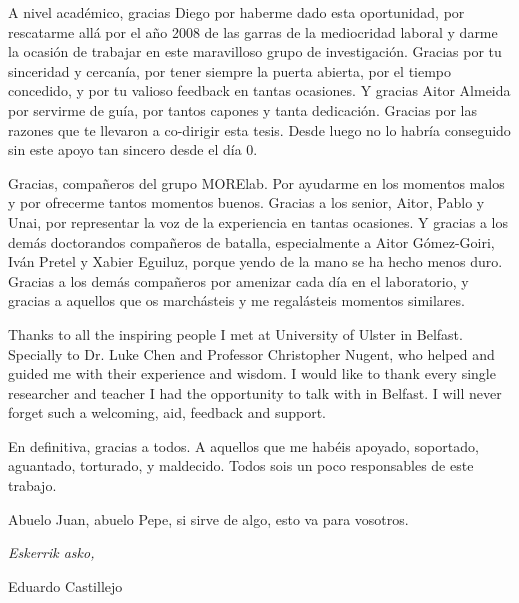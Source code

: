 \begin{acknowledgementslong}
A nivel académico, gracias Diego por haberme dado esta oportunidad, por rescatarme
allá por el año 2008 de las garras de la mediocridad laboral y darme la ocasión
de trabajar en este maravilloso grupo de investigación. Gracias
por tu sinceridad
y cercanía, por tener siempre la puerta abierta, por el tiempo concedido, y por
tu valioso feedback en tantas ocasiones. Y gracias Aitor Almeida por servirme de
guía, por tantos capones y tanta dedicación. Gracias por las razones que te llevaron
a co-dirigir esta tesis. Desde luego no lo habría conseguido sin este apoyo tan
sincero desde el día 0.

Gracias, compañeros del grupo MORElab. Por ayudarme en los momentos malos y por
ofrecerme tantos momentos buenos. Gracias a los senior, Aitor, Pablo y Unai, por
representar la voz de la experiencia en tantas ocasiones. Y gracias a los demás
doctorandos compañeros de batalla, especialmente a Aitor Gómez-Goiri, Iván Pretel
y Xabier Eguiluz, porque yendo de la mano se ha hecho menos duro. Gracias a los
demás compañeros por amenizar cada día en el laboratorio, y gracias a aquellos
que os marchásteis y me regalásteis momentos similares.

Thanks to all the inspiring people I met at University of Ulster in Belfast.
Specially to Dr. Luke Chen and Professor Christopher Nugent, who helped and
guided me with their experience and wisdom. I would like to thank every single
researcher and teacher I had the opportunity to talk with in Belfast. I will
never forget such a welcoming, aid, feedback and support.

En definitiva, gracias a todos. A aquellos que me habéis apoyado, soportado,
aguantado, torturado, y maldecido. Todos sois un poco responsables de este
trabajo.

Abuelo Juan, abuelo Pepe, si sirve de algo, esto va para vosotros.

\begin{flushright}
\textit{Eskerrik asko,}

Eduardo Castillejo

\monthname \ \the\year







\end{flushright}



\end{acknowledgementslong}



